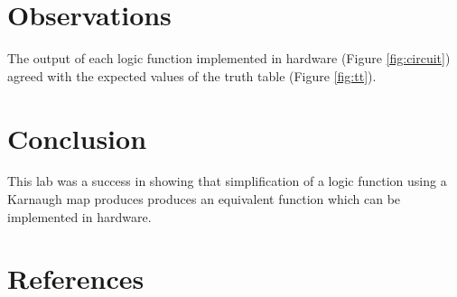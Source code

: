 \documentclass[12pt]{article}
\begin{document}
\clearpage

\section{Observations}

The output of each logic function implemented in hardware
(Figure \ref{fig:circuit}) agreed with the expected values
of the truth table (Figure \ref{fig:tt}).

\section{Conclusion}

This lab was a success in showing that simplification of a
logic function using a Karnaugh map produces produces an
equivalent function which can be implemented in hardware.


\renewcommand*{\refname}{\vspace{-8mm}}
\section{References}
%
%



\end{document}
